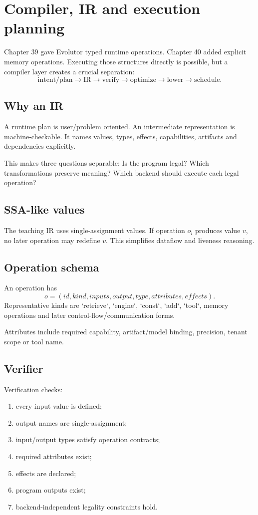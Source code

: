 \chapter{Compiler, IR and execution planning}

Chapter 39 gave Evolutor typed runtime operations. Chapter 40 added explicit memory operations. Executing those structures directly is possible, but a compiler layer creates a crucial separation:
\[
\text{intent/plan}\rightarrow\text{IR}\rightarrow\text{verify}\rightarrow\text{optimize}\rightarrow\text{lower}\rightarrow\text{schedule}.
\]

\section{Why an IR}
A runtime plan is user/problem oriented. An intermediate representation is machine-checkable. It names values, types, effects, capabilities, artifacts and dependencies explicitly.

This makes three questions separable: Is the program legal? Which transformations preserve meaning? Which backend should execute each legal operation?

\section{SSA-like values}
The teaching IR uses single-assignment values. If operation $o_i$ produces value $v$, no later operation may redefine $v$. This simplifies dataflow and liveness reasoning.

\section{Operation schema}
An operation has
\[
o=(id,kind,inputs,output,type,attributes,effects).
\]
Representative kinds are `retrieve`, `engine`, `const`, `add`, `tool`, memory operations and later control-flow/communication forms.

Attributes include required capability, artifact/model binding, precision, tenant scope or tool name.

\section{Verifier}
Verification checks:
\begin{enumerate}
\item every input value is defined;
\item output names are single-assignment;
\item input/output types satisfy operation contracts;
\item required attributes exist;
\item effects are declared;
\item program outputs exist;
\item backend-independent legality constraints hold.
\end{enumerate}

